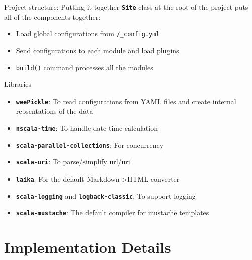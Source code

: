 \documentclass[compress, aspectratio=169]{beamer}
\renewcommand{\imp}[1]{\texttt{\textbf{#1}}}
\begin{document}
\begin{frame}{Project structure: Putting it together}
    \imp{Site} class at the root of the project puts all of the components together:
    \begin{itemize}
        \item Load global configurations from \texttt{/_config.yml}
        \item Send configurations to each module and load plugins
        \item \texttt{build()} command processes all the modules 
    \end{itemize}
\end{frame}

\begin{frame}{Libraries}
    \begin{itemize}
        \item \imp{weePickle}: To read configurations from YAML files and create
            internal repsentations of the data
        \item \imp{nscala-time}: To handle date-time calculation
        \item \imp{scala-parallel-collections}: For concurrency
        \item \imp{scala-uri}: To parse/simplify url/uri
        \item \imp{laika}: For the default Markdown->HTML converter
        \item \imp{scala-logging} and \imp{logback-classic}: To support logging
        \item \imp{scala-mustache}: The default compiler for mustache templates
    \end{itemize}
\end{frame}

\section{Implementation Details}
\end{document}
